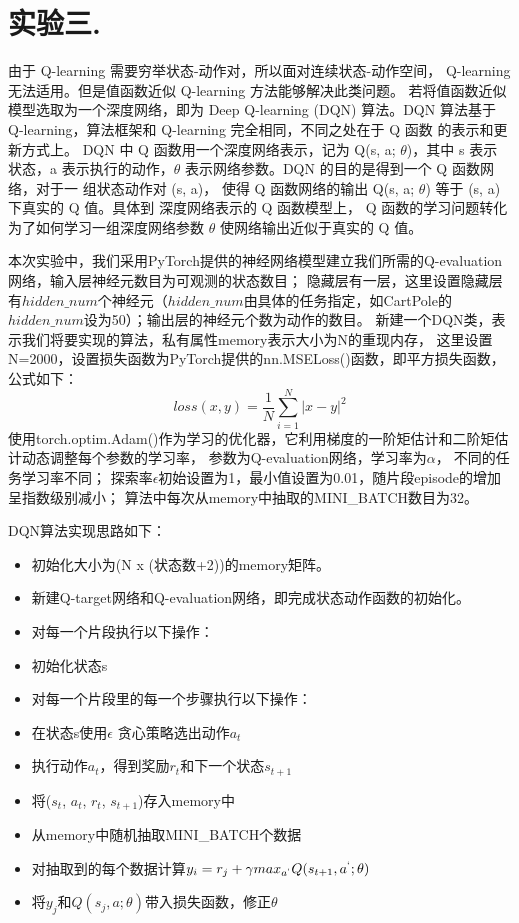 \documentclass[a4paper,UTF8]{article}
\theoremstyle{definition}
\begin{document}
\section*{实验三. }
由于 Q-learning 需要穷举状态-动作对，所以面对连续状态-动作空间， Q-learning 无法适用。但是值函数近似 Q-learning 方法能够解决此类问题。
若将值函数近似模型选取为一个深度网络，即为 Deep Q-learning (DQN) 算法。DQN 算法基于 Q-learning，算法框架和 Q-learning 完全相同，不同之处在于 Q 函数 的表示和更新方式上。
DQN 中 Q 函数用一个深度网络表示，记为 Q(s, a; $\theta$)，其中 s 表示 状态，a 表示执行的动作，$\theta$ 表示网络参数。DQN 的目的是得到一个 Q 函数网络，对于一 组状态动作对 (s, a)，
使得 Q 函数网络的输出 Q(s, a; $\theta$) 等于 (s, a) 下真实的 Q 值。具体到 深度网络表示的 Q 函数模型上，
Q 函数的学习问题转化为了如何学习一组深度网络参数 $\theta$ 使网络输出近似于真实的 Q 值。
	
本次实验中，我们采用PyTorch提供的神经网络模型建立我们所需的Q-evaluation网络，输入层神经元数目为可观测的状态数目；
隐藏层有一层，这里设置隐藏层有$hidden\_num$个神经元（$hidden\_num$由具体的任务指定，如CartPole的$hidden\_num$设为50）；输出层的神经元个数为动作的数目。
新建一个DQN类，表示我们将要实现的算法，私有属性memory表示大小为N的重现内存，
这里设置N=2000，设置损失函数为PyTorch提供的nn.MSELoss()函数，即平方损失函数，公式如下：
$$loss(x, y) = \frac{1}{N} \sum_{i=1}^N |x - y|^2$$
使用torch.optim.Adam()作为学习的优化器，它利用梯度的一阶矩估计和二阶矩估计动态调整每个参数的学习率，
参数为Q-evaluation网络，学习率为$\alpha$，不同的任务学习率不同；
探索率$\epsilon$初始设置为1，最小值设置为0.01，随片段episode的增加呈指数级别减小；
算法中每次从memory中抽取的MINI\_BATCH数目为32。

DQN算法实现思路如下：
\begin{itemize}
	\item 初始化大小为(N x (状态数+2))的memory矩阵。
	\item 新建Q-target网络和Q-evaluation网络，即完成状态动作函数的初始化。
	\item 对每一个片段执行以下操作：
	\item 初始化状态s
	\item 对每一个片段里的每一个步骤执行以下操作：
	\item 在状态s使用$\epsilon$ 贪心策略选出动作$a_t$
	\item 执行动作$a_t$，得到奖励$r_t$和下一个状态$s_{t+1}$
	\item 将($s_t$, $a_t$, $r_t$, $s_{t+1}$)存入memory中
	\item 从memory中随机抽取MINI\_BATCH个数据
	\item 对抽取到的每个数据计算$y_i = r_j + \gamma max_{a^`} Q(s_{t+1}, a^`; \theta)$
	\item 将$y_j$和$Q(s_j, a; \theta)$带入损失函数，修正$\theta$
\end{itemize}
\end{document}
